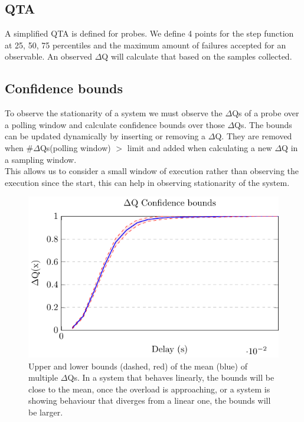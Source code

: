     \subsection{QTA}
        A simplified QTA is defined for probes. We define 4 points for the step function at 25, 50, 75 percentiles and the maximum amount of failures accepted for an observable. An observed $\Delta$Q will calculate that based on the samples collected. 

\subsection{Confidence bounds}
    To observe the stationarity of a system we must observe the $\Delta$Qs of a probe over a polling window and calculate confidence bounds over those $\Delta$Qs. The bounds can be updated dynamically by inserting or removing a $\Delta$Q. They are removed when \#$\Delta$Qs(polling window) $>$ limit and added when calculating a new $\Delta$Q in a sampling window. \\
    This allows us to consider a small window of execution rather than observing the execution since the start, this can help in observing stationarity of the system.
        \begin{figure}[H]
            \begin{center}
                \includegraphics[scale=1]{tikz/ci.pdf} 
            \end{center}
            \caption{Upper and lower bounds (dashed, red) of the mean (blue) of multiple $\Delta$Qs. In a system that behaves linearly, the bounds will be close to the mean, once the overload is approaching, or a system is showing behaviour that diverges from a linear one, the bounds will be larger.}
        \end{figure}

  
